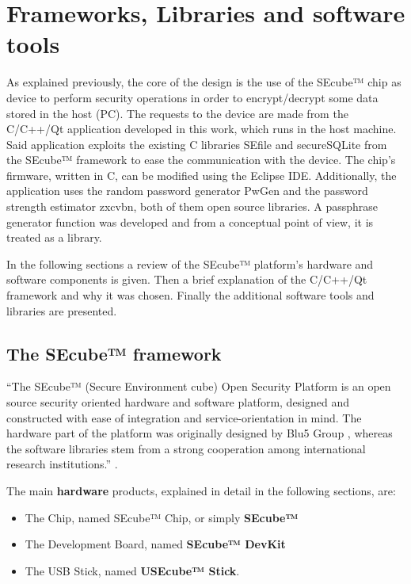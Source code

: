 \chapter{Frameworks, Libraries and software tools} \label{chap:lib}

As explained previously, the core of the design is the use of the SEcube™ chip as device to perform security operations in order to encrypt/decrypt some data stored in the host (PC). The requests to the device are made from the C/C++/Qt application developed in this work, which runs in the host machine. Said application exploits the existing C libraries SEfile and secureSQLite from the SEcube™ framework to ease the communication with the device. The chip's firmware, written in C, can be modified using the Eclipse IDE. Additionally, the application uses the random password generator PwGen and the password strength estimator zxcvbn, both of them open source libraries. A passphrase generator function was developed and from a conceptual point of view, it is treated as a library.

In the following sections a review of the SEcube™ platform's hardware and software components is given. Then a brief explanation of the C/C++/Qt framework and why it was chosen. Finally the additional software tools and libraries are presented.

\section{The SEcube™ framework}

``The SEcube™ (Secure Environment cube) Open Security Platform is an open source security oriented hardware and software platform, designed and constructed with ease of integration and service-orientation in mind. The hardware part of the platform was originally designed by Blu5 Group \cite{Blu5}, whereas the software libraries stem from a strong cooperation among international research institutions.'' \cite{GetStart}.

\vspace{5pt}

The main \textbf{hardware} products, explained in detail in the following sections, are:
\begin{itemize}
\setlength\itemsep{0pt}
\item The Chip, named SEcube™ Chip, or simply \textbf{SEcube™}
\item The Development Board, named \textbf{SEcube™ DevKit}
\item The USB Stick, named \textbf{USEcube™ Stick}.
\end{itemize}

